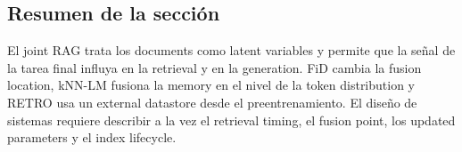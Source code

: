 \subsection{Resumen de la sección}

El joint RAG trata los documents como latent variables y permite que la señal de la tarea final influya en la retrieval y en la generation. FiD cambia la fusion location, kNN-LM fusiona la memory en el nivel de la token distribution y RETRO usa un external datastore desde el preentrenamiento. El diseño de sistemas requiere describir a la vez el retrieval timing, el fusion point, los updated parameters y el index lifecycle.
